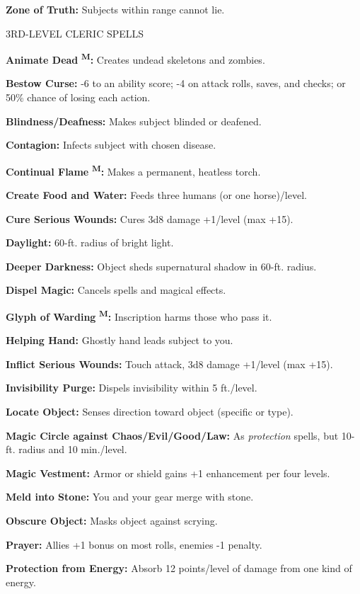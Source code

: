 \documentclass{article}
\begin{document}
\textbf{Zone of Truth:} Subjects within range cannot lie.

3RD-LEVEL CLERIC SPELLS

\textbf{Animate Dead }\textsuperscript{\textbf{M}}\textbf{:} Creates undead skeletons 
and zombies.

\textbf{Bestow Curse:} -6 to an ability score; -4 on attack rolls, saves, and checks; 
or 50\% chance of losing each action.

\textbf{Blindness/Deafness: }Makes subject blinded or deafened.

\textbf{Contagion:} Infects subject with chosen disease.

\textbf{Continual Flame }\textsuperscript{\textbf{M}}\textbf{: }Makes a permanent, 
heatless torch.

\textbf{Create Food and Water:} Feeds three humans (or one horse)/level.

\textbf{Cure Serious Wounds:} Cures 3d8 damage +1/level (max +15).

\textbf{Daylight:} 60-ft. radius of bright light.

\textbf{Deeper Darkness:} Object sheds supernatural shadow in 60-ft. radius.

\textbf{Dispel Magic:} Cancels spells and magical effects.

\textbf{Glyph of Warding }\textsuperscript{\textbf{M}}\textbf{:} Inscription harms 
those who pass it.

\textbf{Helping Hand:} Ghostly hand leads subject to you.

\textbf{Inflict Serious Wounds:} Touch attack, 3d8 damage +1/level (max +15).

\textbf{Invisibility Purge:} Dispels invisibility within 5 ft./level.

\textbf{Locate Object:} Senses direction toward object (specific or type).

\textbf{Magic Circle against Chaos/Evil/Good/Law:} As \textit{protection }spells, 
but 10-ft. radius and 10 min./level.

\textbf{Magic Vestment:} Armor or shield gains +1 enhancement per four levels.

\textbf{Meld into Stone:} You and your gear merge with stone.

\textbf{Obscure Object: }Masks object against scrying.

\textbf{Prayer:} Allies +1 bonus on most rolls, enemies -1 penalty.

\textbf{Protection from Energy:} Absorb 12 points/level of damage from one kind 
of energy.
\end{document}
